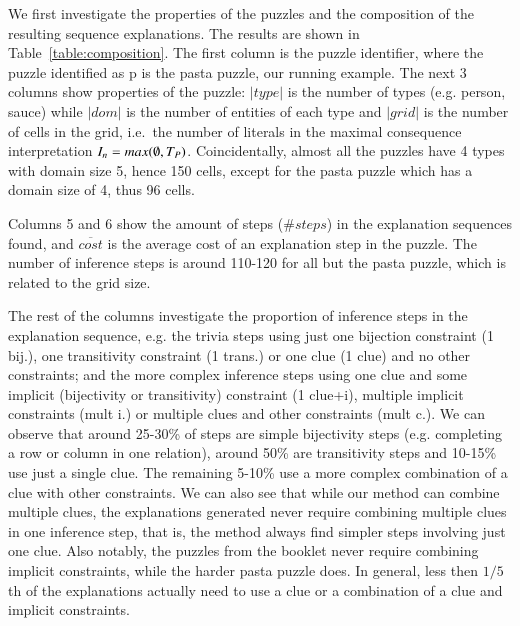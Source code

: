 We first investigate the properties of the puzzles and the composition of the resulting sequence explanations. The results are shown in Table~\ref{table:composition}. The first column is the puzzle identifier, where the puzzle identified as p is the pasta puzzle, our running example. 
The next 3 columns show properties of the puzzle:
$|type|$ is the number of types (e.g. person, sauce) while $|dom|$ is the number of entities of each type and $|grid|$ is the number of cells in the grid, i.e.\ the number of literals in the maximal consequence interpretation $I_n=max(\emptyset, T_P)$.
Coincidentally, almost all the puzzles have 4 types with domain size 5,  hence 150 cells, except for the pasta puzzle which has a domain size of 4, thus 96 cells.

Columns 5 and 6 show the amount of steps ($\# steps$) in the explanation sequences found, and $\overline{cost}$ is the average cost of an explanation step in the puzzle. The number of inference steps is around 110-120 for all but the pasta puzzle, which is related to the grid size.

The rest of the columns investigate the proportion of inference steps in the explanation sequence, e.g. the trivia steps using just one bijection constraint (1 bij.), one transitivity constraint (1 trans.) or one clue (1 clue) and no other constraints; and the more complex inference steps using one clue and some implicit (bijectivity or transitivity) constraint (1 clue+i), multiple implicit constraints (mult i.) or multiple clues and other constraints (mult c.). We can observe that around 25-30\% of steps are simple bijectivity steps (e.g. completing a row or column in one relation), around 50\% are transitivity steps and 10-15\% use just a single clue. The remaining 5-10\% use a more complex combination of a clue with other constraints. We can also see that while our method can combine multiple clues, the explanations generated never require combining multiple clues in one inference step, that is, the method always find simpler steps involving just one clue. Also notably, the puzzles from the booklet never require combining implicit constraints, while the harder pasta puzzle does. In general, less then $1/5$th of the explanations actually need to use a clue or a combination of a clue and implicit constraints.

